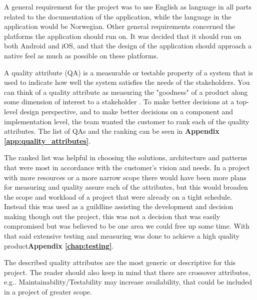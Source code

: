A general requirement for the project was to use English as language in all parts related to the documentation of the application, while the language in the application would be Norwegian. Other general requirements concerned the platforms the application should run on. It was decided that it should run on both Android and iOS, and that the design of the application should approach a native feel as much as possible on these platforms.\newline

A quality attribute (QA) is a measurable or testable property of a system that is used to indicate how well the system satisfies the needs of the stakeholders. You can think of a quality attribute as measuring the "goodness" of a product along some dimension of interest to a stakeholder \cite[p.63]{Bass:2012:SAP:2392670}. To make better decisions at a top-level design perspective, and to make better decisions on a component and implementation level, the team wanted the customer to rank each of the quality attributes. The list of QAs and the ranking can be seen in \textbf{Appendix \ref{app:quality_attributes}}. \newline

The ranked list was helpful in choosing the solutions, architecture and patterns that were most in accordance with the customer's vision and needs. In a project with more resources or a more narrow scope there would have been more plans for measuring and quality assure each of the attributes, but this would broaden the scope and workload of a project that were already on a tight schedule. Instead this was used as a guildline assisting the development and decision making though out the project, this was not a decision that was easily compromised but was believed to be one area we could free up some time. With that said extensive testing and measuring was done to achieve a high quality product\textbf{Appendix \ref{chap:testing}}.\newline


The described quality attributes are the most generic or descriptive for this project. The reader should also keep in mind that there are crossover attributes, e.g.. Maintainability/Testability may increase availability, that could be included in a project of greater scope.

\cleardoublepage

